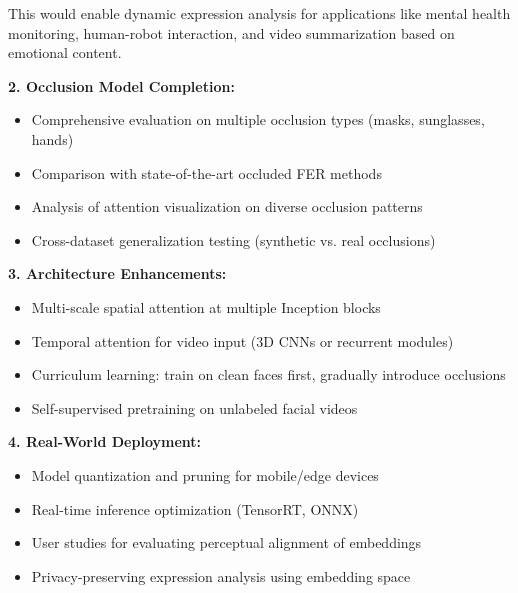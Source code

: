 \documentclass[10pt,twocolumn]{article}
\begin{document}
This would enable dynamic expression analysis for applications like mental health monitoring, human-robot interaction, and video summarization based on emotional content.

\textbf{2. Occlusion Model Completion:}
\begin{itemize}
    \item Comprehensive evaluation on multiple occlusion types (masks, sunglasses, hands)
    \item Comparison with state-of-the-art occluded FER methods
    \item Analysis of attention visualization on diverse occlusion patterns
    \item Cross-dataset generalization testing (synthetic vs. real occlusions)
\end{itemize}

\textbf{3. Architecture Enhancements:}
\begin{itemize}
    \item Multi-scale spatial attention at multiple Inception blocks
    \item Temporal attention for video input (3D CNNs or recurrent modules)
    \item Curriculum learning: train on clean faces first, gradually introduce occlusions
    \item Self-supervised pretraining on unlabeled facial videos
\end{itemize}

\textbf{4. Real-World Deployment:}
\begin{itemize}
    \item Model quantization and pruning for mobile/edge devices
    \item Real-time inference optimization (TensorRT, ONNX)
    \item User studies for evaluating perceptual alignment of embeddings
    \item Privacy-preserving expression analysis using embedding space
\end{itemize}
\end{document}
